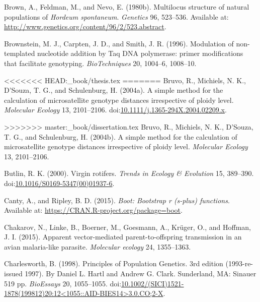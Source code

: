 \documentclass[double,12pt]{beavtex}
\begin{document}
  \hypertarget{ref-brown1980multilocus}{}
  Brown, A., Feldman, M., and Nevo, E. (1980b). Multilocus structure of
  natural populations of \emph{Hordeum spontaneum}. \emph{Genetics} 96,
  523--536. Available at:
  \url{http://www.genetics.org/content/96/2/523.abstract}.
  
  \hypertarget{ref-brownstein1996modulation}{}
  Brownstein, M. J., Carpten, J. D., and Smith, J. R. (1996). Modulation
  of non-templated nucleotide addition by Taq DNA polymerase: primer
  modifications that facilitate genotyping. \emph{BioTechniques} 20,
  1004--6, 1008--10.
  
<<<<<<< HEAD:_book/thesis.tex
=======
  \hypertarget{ref-Bruvo:2004}{}
  Bruvo, R., Michiels, N. K., D'Souza, T. G., and Schulenburg, H. (2004a).
  A simple method for the calculation of microsatellite genotype distances
  irrespective of ploidy level. \emph{Molecular Ecology} 13, 2101--2106.
  doi:\href{https://doi.org/10.1111/j.1365-294X.2004.02209.x}{10.1111/j.1365-294X.2004.02209.x}.
  
>>>>>>> master:_book/dissertation.tex
  \hypertarget{ref-bruvo2004simple}{}
  Bruvo, R., Michiels, N. K., D'Souza, T. G., and Schulenburg, H. (2004b).
  A simple method for the calculation of microsatellite genotype distances
  irrespective of ploidy level. \emph{Molecular Ecology} 13, 2101--2106.
  
  \hypertarget{ref-butlin2000virgin}{}
  Butlin, R. K. (2000). Virgin rotifers. \emph{Trends in Ecology \&
  Evolution} 15, 389--390.
  doi:\href{https://doi.org/10.1016/S0169-5347(00)01937-6}{10.1016/S0169-5347(00)01937-6}.
  
  \hypertarget{ref-canty2015boot}{}
  Canty, A., and Ripley, B. D. (2015). \emph{Boot: Bootstrap r (s-plus)
  functions}. Available at: \url{https://CRAN.R-project.org/package=boot}.
  
  \hypertarget{ref-chakarov2015apparent}{}
  Chakarov, N., Linke, B., Boerner, M., Goesmann, A., Krüger, O., and
  Hoffman, J. I. (2015). Apparent vector-mediated parent-to-offspring
  transmission in an avian malaria-like parasite. \emph{Molecular ecology}
  24, 1355--1363.
  
  \hypertarget{ref-Charlesworth_1998}{}
  Charlesworth, B. (1998). Principles of Population Genetics. 3rd edition
  (1993-re-issued 1997). By Daniel L. Hartl and Andrew G. Clark.
  Sunderland, MA: Sinauer 519 pp. \emph{BioEssays} 20, 1055--1055.
  doi:\href{https://doi.org/10.1002/(SICI)1521-1878(199812)20:12\%3C1055::AID-BIES14\%3E3.0.CO;2-X}{10.1002/(SICI)1521-1878(199812)20:12\textless{}1055::AID-BIES14\textgreater{}3.0.CO;2-X}.
  
\end{document}
